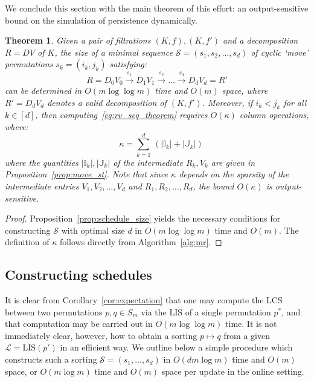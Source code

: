 \documentclass[sn-mathphys]{sn-jnl}
\newtheorem{theorem}{Theorem}
\begin{document}
We conclude this section with the main theorem of this effort: an output-sensitive bound on the simulation of persistence dynamically.
  \begin{theorem}\label{prop:sparsity_result}
   Given a pair of filtrations $(K,f), (K,f')$ and a decomposition $R = DV$ of $K$, the size of a minimal sequence $\mathcal{S} = \left( s_1, s_2, \dots, s_d \right)$ of cyclic `move' permutations $s_k = (i_k, j_k)$ satisfying: 
   	\begin{equation}\label{eq:rv_seq_theorem}
   		R = D_0 V_0 \overset{s_1}{\to} D_1 V_{1} \overset{s_2}{\to} \dots \overset{s_d}{\to} D_d V_{d} = R'
   	\end{equation}
   	can be determined in $O(m \log \log m)$ time and $O(m)$ space, where $R' = D_d V_d$ denotes a valid decomposition of $(K, f')$. 
   	Moreover, if $i_k < j_k$ for all $k \in [d]$, then computing~\eqref{eq:rv_seq_theorem} requires $O(\kappa)$ column operations, where:	  
   	$$  \quad \kappa = \sum\limits_{k = 1}^d \, (\lvert \mathbb{I}_{k} \rvert + \lvert \mathbb{J}_{k} \rvert) $$
	where the quantities $\lvert \mathbb{I}_{k} \rvert, \lvert \mathbb{J}_{k} \rvert$ of the intermediate $R_k, V_k$ are given in Proposition~\ref{prop:move_st}. Note that since $\kappa$ depends on the sparsity of the intermediate entries $V_1, V_2, \dots, V_d$ and $R_1, R_2, \dots, R_d$, the bound $O(\kappa)$ is output-sensitive. 
\end{theorem}
\begin{proof} \normalsize
	Proposition~\ref{prop:schedule_size} yields the necessary conditions for constructing $\mathcal{S}$  with optimal size $d$ in $O(m \log \log m)$ time and $O(m)$. The definition of $\kappa$ follows directly from Algorithm~\ref{alg:mr}. 
\end{proof}

 
\subsection{Constructing schedules}\label{sec:schedule_construction}
It is clear from Corollary~\ref{cor:expectation} that one may compute the LCS between two permutations $p, q \in S_m$ via the LIS of a single permutation $p^\ast$, and that computation may be carried out in $O(m \log \log m)$ time. 
It is not immediately clear, however, how to obtain a sorting $p \mapsto q$ from a given $\mathcal{L} = \mathrm{LIS}(p')$ in an efficient way. We outline below a simple procedure which constructs such a sorting $\mathcal{S} = (s_1, \dots, s_d)$ in $O(dm\log m)$ time and $O(m)$ space, or $O(m \log m)$ time and $O(m)$ space per update in the online setting.
 
\end{document}
